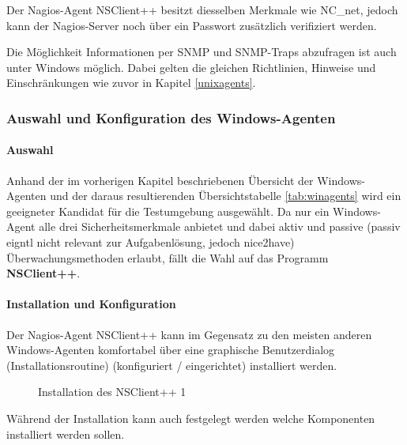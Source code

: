 Der Nagios-Agent NSClient++ besitzt diesselben Merkmale wie NC\_net, jedoch kann der Nagios-Server noch über ein Passwort zusätzlich verifiziert werden.

Die Möglichkeit Informationen per \gls{SNMP} und \gls{SNMP}-Traps abzufragen ist auch unter Windows möglich.
Dabei gelten die gleichen Richtlinien, Hinweise und Einschränkungen wie zuvor in Kapitel \ref{unixagents}.

\subsubsection{Auswahl und Konfiguration des Windows-Agenten}

\paragraph{Auswahl}
Anhand der im vorherigen Kapitel beschriebenen Übersicht der Windows-Agenten und der daraus resultierenden Übersichtstabelle \ref{tab:winagents} wird ein geeigneter Kandidat für die Testumgebung ausgewählt.
Da nur ein Windows-Agent alle drei Sicherheitsmerkmale anbietet und dabei aktiv und passive (passiv eigntl nicht relevant zur Aufgabenlösung, jedoch nice2have) Überwachungsmethoden erlaubt, fällt die Wahl auf das Programm \textbf{NSClient++}.

\paragraph{Installation und Konfiguration}

Der Nagios-Agent NSClient++ kann im Gegensatz zu den meisten anderen Windows-Agenten komfortabel über eine graphische Benutzerdialog (Installationsroutine) (konfiguriert / eingerichtet) installiert werden.

\begin{figure}[ht]
	\centering
		\caption{Installation des NSClient++ 1}
		\label{nscs1}
\end{figure}
Während der Installation kann auch festgelegt werden welche Komponenten installiert werden sollen.


